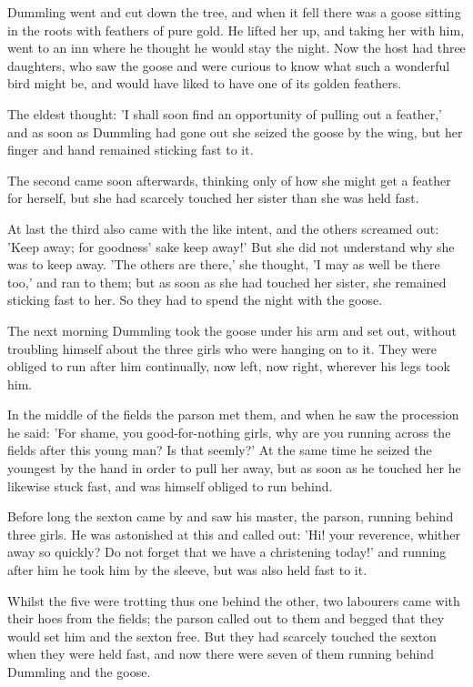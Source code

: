 \documentclass[12pt]{book}
\begin{document}
Dummling went and cut down the tree, and when it fell there was a
goose sitting in the roots with feathers of pure gold. He lifted her
up, and taking her with him, went to an inn where he thought he would
stay the night. Now the host had three daughters, who saw the goose
and were curious to know what such a wonderful bird might be, and
would have liked to have one of its golden feathers.

The eldest thought: 'I shall soon find an opportunity of pulling out a
feather,' and as soon as Dummling had gone out she seized the goose by
the wing, but her finger and hand remained sticking fast to it.

The second came soon afterwards, thinking only of how she might get a
feather for herself, but she had scarcely touched her sister than she
was held fast.

At last the third also came with the like intent, and the others
screamed out: 'Keep away; for goodness' sake keep away!' But she did
not understand why she was to keep away. 'The others are there,' she
thought, 'I may as well be there too,' and ran to them; but as soon as
she had touched her sister, she remained sticking fast to her. So they
had to spend the night with the goose.

The next morning Dummling took the goose under his arm and set out,
without troubling himself about the three girls who were hanging on to
it. They were obliged to run after him continually, now left, now
right, wherever his legs took him.

In the middle of the fields the parson met them, and when he saw the
procession he said: 'For shame, you good-for-nothing girls, why are
you running across the fields after this young man? Is that seemly?'
At the same time he seized the youngest by the hand in order to pull
her away, but as soon as he touched her he likewise stuck fast, and
was himself obliged to run behind.

Before long the sexton came by and saw his master, the parson, running
behind three girls. He was astonished at this and called out: 'Hi!
your reverence, whither away so quickly? Do not forget that we have a
christening today!' and running after him he took him by the sleeve,
but was also held fast to it.

Whilst the five were trotting thus one behind the other, two labourers
came with their hoes from the fields; the parson called out to them
and begged that they would set him and the sexton free. But they had
scarcely touched the sexton when they were held fast, and now there
were seven of them running behind Dummling and the goose.
\end{document}
